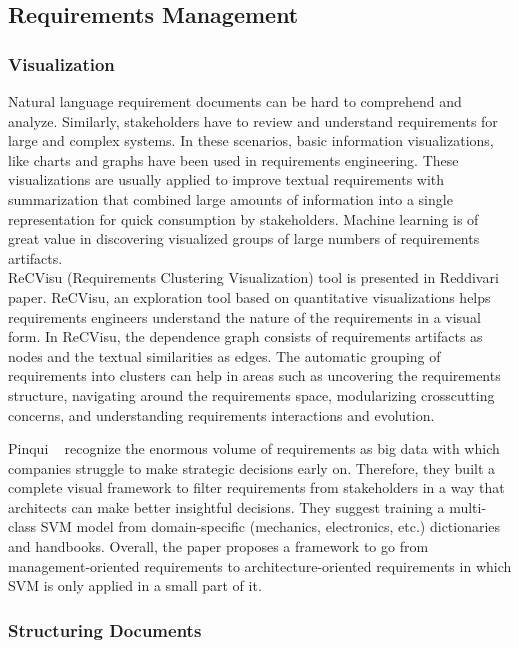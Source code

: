 \subsection{Requirements Management}

\subsubsection{Visualization}

Natural language requirement documents can be hard to comprehend and analyze. Similarly, stakeholders have to review and understand requirements for large and complex systems.  In these scenarios, basic information visualizations, like charts and graphs have been used in requirements engineering. These visualizations are usually applied to improve textual requirements with summarization that combined large amounts of information into a single representation for quick consumption by stakeholders\cite{Reddivari:2012}. Machine learning is of great value in discovering visualized groups of large numbers of requirements artifacts.\\

ReCVisu (Requirements Clustering Visualization) tool is presented in Reddivari \etal~\cite{Reddivari:2012} paper. ReCVisu, an exploration tool based on quantitative visualizations helps requirements engineers understand the nature of the requirements in a visual form. In ReCVisu, the dependence graph consists of requirements artifacts as nodes and the textual similarities as edges. The automatic grouping of requirements into clusters can help in areas such as uncovering the requirements structure, navigating around the requirements space, modularizing crosscutting concerns, and understanding requirements interactions and evolution.\newline

Pinqui \etal~\cite{Pinqui:2015} recognize the enormous volume of requirements as big data with which companies struggle to make strategic decisions early on. Therefore, they built a complete visual framework to filter requirements from stakeholders in a way that architects can make better insightful decisions. They suggest training a multi-class SVM model from domain-specific (mechanics, electronics, etc.) dictionaries and handbooks. Overall, the paper proposes a framework to go from management-oriented requirements to architecture-oriented requirements in which SVM is only applied in a small part of it. 

\subsubsection{Structuring Documents}

